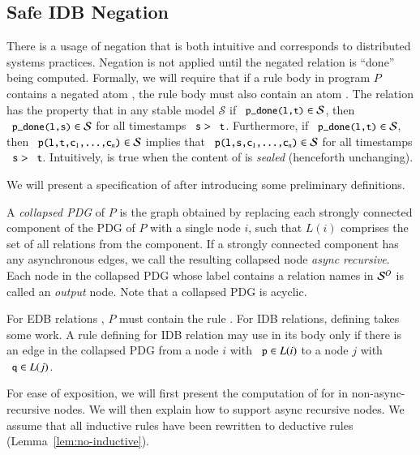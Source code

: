 \subsection{Safe IDB Negation}
\label{sec:perfect-construction}

There is a usage of negation that is both intuitive and corresponds to
distributed systems practices.  Negation is not applied until the negated
relation is ``done'' being computed.  Formally, we will require that if a rule
body in program $P$ contains a negated atom , the rule body must
also contain an atom . The relation  has the
property that in any stable model $\mathcal{S}$ if $\dedalus{p_done(l,t)} \in
\mathcal{S}$, then $\dedalus{p_done(l,s)} \in \mathcal{S}$ for all timestamps
$\dedalus{s} > \dedalus{t}$.  Furthermore, if $\dedalus{p_done(l,t)} \in
\mathcal{S}$, then $\dedalus{p(l,t,c\sub{1},\ldots,c\sub{n})} \in \mathcal{S}$
implies that $\dedalus{p(l,s,c\sub{1},\ldots,c\sub{n})} \in \mathcal{S}$ for all
timestamps $\dedalus{s} > \dedalus{t}$.  Intuitively,  is true
when the content of  is {\em sealed} (henceforth unchanging).

We will present a specification of  after introducing some preliminary definitions.

A {\em collapsed PDG} of $P$ is the graph obtained by replacing each strongly
connected component of the PDG of $P$ with a single node $i$, such that $L(i)$
comprises
the set of all relations from the component.  If a strongly connected
component has any asynchronous edges, we call the resulting collapsed node {\em
  async recursive}.  Each node in the collapsed PDG whose label contains a
relation names in $\oschema$ is called an {\em output} node.  Note that a
collapsed PDG is acyclic.

For EDB relations , $P$ must contain the rule  .  For
IDB relations, defining  takes some work.  A rule defining
 for IDB relation  may use  in
its body only if there is an edge in the collapsed PDG from a node $i$ with
$\dedalus{p} \in L(i)$ to a node $j$ with $\dedalus{q} \in L(j)$.  

For ease of exposition, we will first present the computation of  for  in non-async-recursive nodes.  We will then explain how to support async recursive nodes.  We assume that all inductive rules have been rewritten to deductive rules (Lemma~\ref{lem:no-inductive}).

